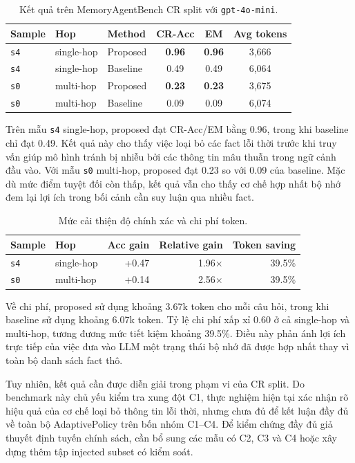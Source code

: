 \documentclass[12pt,a4paper]{article}
\newcommand{\code}[1]{\texttt{#1}}
\begin{document}
\begin{table}[H]
\centering
\caption{Kết quả trên MemoryAgentBench CR split với \code{gpt-4o-mini}.}
\label{tab:real-results}
\begin{tabular}{lllccc}
\toprule
\textbf{Sample} & \textbf{Hop} & \textbf{Method} & \textbf{CR-Acc} & \textbf{EM} & \textbf{Avg tokens} \\
\midrule
\code{s4} & single-hop & Proposed & \textbf{0.96} & \textbf{0.96} & 3,666 \\
\code{s4} & single-hop & Baseline & 0.49 & 0.49 & 6,064 \\
\code{s0} & multi-hop & Proposed & \textbf{0.23} & \textbf{0.23} & 3,675 \\
\code{s0} & multi-hop & Baseline & 0.09 & 0.09 & 6,074 \\
\bottomrule
\end{tabular}
\end{table}

Trên mẫu \code{s4} single-hop, proposed đạt CR-Acc/EM bằng 0.96, trong khi baseline chỉ đạt 0.49. Kết quả này cho thấy việc loại bỏ các fact lỗi thời trước khi truy vấn giúp mô hình tránh bị nhiễu bởi các thông tin mâu thuẫn trong ngữ cảnh đầu vào. Với mẫu \code{s0} multi-hop, proposed đạt 0.23 so với 0.09 của baseline. Mặc dù mức điểm tuyệt đối còn thấp, kết quả vẫn cho thấy cơ chế hợp nhất bộ nhớ đem lại lợi ích trong bối cảnh cần suy luận qua nhiều fact.

\begin{table}[H]
\centering
\caption{Mức cải thiện độ chính xác và chi phí token.}
\label{tab:improvement}
\begin{tabular}{llrrr}
\toprule
\textbf{Sample} & \textbf{Hop} & \textbf{Acc gain} & \textbf{Relative gain} & \textbf{Token saving} \\
\midrule
\code{s4} & single-hop & +0.47 & 1.96$\times$ & 39.5\% \\
\code{s0} & multi-hop & +0.14 & 2.56$\times$ & 39.5\% \\
\bottomrule
\end{tabular}
\end{table}

Về chi phí, proposed sử dụng khoảng 3.67k token cho mỗi câu hỏi, trong khi baseline sử dụng khoảng 6.07k token. Tỷ lệ chi phí xấp xỉ 0.60 ở cả single-hop và multi-hop, tương đương mức tiết kiệm khoảng 39.5\%. Điều này phản ánh lợi ích trực tiếp của việc đưa vào LLM một trạng thái bộ nhớ đã được hợp nhất thay vì toàn bộ danh sách fact thô.

Tuy nhiên, kết quả cần được diễn giải trong phạm vi của CR split. Do benchmark này chủ yếu kiểm tra xung đột C1, thực nghiệm hiện tại xác nhận rõ hiệu quả của cơ chế loại bỏ thông tin lỗi thời, nhưng chưa đủ để kết luận đầy đủ về toàn bộ AdaptivePolicy trên bốn nhóm C1--C4. Để kiểm chứng đầy đủ giả thuyết định tuyến chính sách, cần bổ sung các mẫu có C2, C3 và C4 hoặc xây dựng thêm tập injected subset có kiểm soát.
\end{document}
